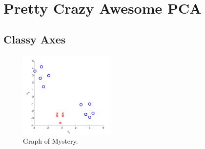 \section{Pretty Crazy Awesome PCA }

\subsection{Classy Axes}

\begin{figure}[h!]
 \centering
 \includegraphics[width=0.43\textwidth]{images/pca_group1.png}
 \caption{Graph of Mystery.}
 \label{fig:pca1}
\end{figure}

